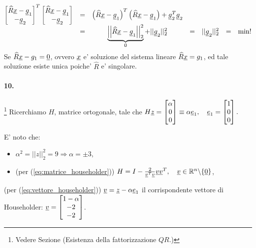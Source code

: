 \begin{enumerate}
\begin{equation*}
\begin{matrix}
			\begin{bmatrix}
				\widehat R\uline x-\uline g_1\\
				-\uline g_2
			\end{bmatrix}^T
			\begin{bmatrix}
				\widehat R\uline x-\uline g_1\\
				-\uline g_2
			\end{bmatrix}&=& \left(\widehat R\uline x-\uline g_1\right)^T\left(\widehat R\uline x-\uline g_1\right)+\uline g_2^T\uline g_2 \\
			&{=}& \underbrace{\left|\left|\widehat R\uline x - \uline g_1\right|\right|_2^2}_0+||\uline g_2||_2^2 &{=}& ||\uline g_2||_2^2&=&\min !
		\end{matrix}
	\end{equation*}
	Se $\widehat{R}\uline x - g_1 = \uline 0$, ovvero $\uline x$ e' soluzione del sistema lineare $\widehat{R}\uline x = g_1$, ed tale soluzione esiste unica poiche' $\widehat{R}$ e' singolare.
\end{enumerate}

\paragraph{10.}\footnote{Vedere Sezione \label{sssec:esistenza_fattorizzazione_QR} (Esistenza della fattorizzazione $QR$.)} Ricerchiamo $H$, matrice ortogonale, tale che $H\uline z =
\begin{bmatrix}
	\alpha\\
	0\\
	0
\end{bmatrix}\equiv \alpha\uline e_1,\quad \uline e_1 =
\begin{bmatrix}
	1\\
	0\\
	0
\end{bmatrix}.$

E' noto che:
\begin{itemize}
	\item $\alpha^2 = ||z||_2^2 = 9 \Rightarrow \alpha = \pm 3$,
	\item (per (\ref{eq:matrice_householder})) $H=I-\frac{2}{\uline v^T\uline v}\uline v\uline v^T,\quad \uline v\in\mathbb R^n\backslash\{\uline 0\}$,
\end{itemize}
(per (\ref{eq:vettore_householder})) $\uline v = \uline z-\alpha\uline e_1$ il corrispondente vettore di Householder: $\uline v = \begin{bmatrix}
	1-\alpha\\
	-2\\
	-2
\end{bmatrix}$.

